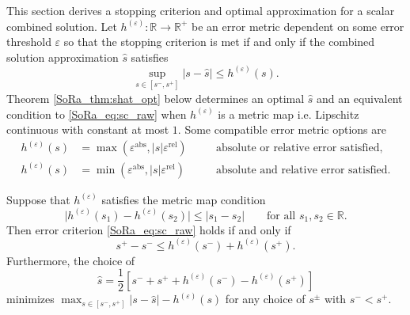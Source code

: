 \documentclass[graybox]{svmult}
\begin{document}
This section derives a stopping criterion and optimal approximation for a scalar combined solution. Let $h^{(\varepsilon)}: \mathbb{R} \to \mathbb{R}^+$ be an error metric dependent on some error threshold $\varepsilon$ so that the stopping criterion is met if and only if the combined solution approximation $\hat{s}$ satisfies 
\begin{equation}
    \sup_{s \in [s^-,s^+]} \lvert s-\hat{s} \rvert \leq h^{(\varepsilon)}(s).
    \label{SoRa_eq:sc_raw}
\end{equation}
Theorem \ref{SoRa_thm:shat_opt} below determines an optimal $\hat{s}$ and an equivalent condition to \eqref{SoRa_eq:sc_raw} when $h^{(\varepsilon)}$ is a metric map i.e. Lipschitz continuous with constant at most $1$. Some compatible error metric options are
\begin{subequations}
\begin{align}
    h^{(\varepsilon)}(s) &= \max\left(\varepsilon^\text{abs},\lvert s \rvert \varepsilon^\text{rel} \right) \quad &&\text{absolute or relative error satisfied,} \label{SoRa_eq:h_abs_or_rel} \\
    h^{(\varepsilon)}(s) &= \min\left(\varepsilon^\text{abs},\lvert s \rvert \varepsilon^\text{rel} \right) \quad &&\text{absolute and relative error satisfied.} \label{SoRa_eq:h_abs_and_rel}
\end{align}
\end{subequations}
\begin{theorem} \label{SoRa_thm:shat_opt}
    Suppose that  $h^{(\varepsilon)}$ satisfies the metric map condition
    \begin{equation}
        \lvert h^{(\varepsilon)}(s_1) - h^{(\varepsilon)}(s_2) \rvert \leq \lvert s_1 - s_2 \rvert \qquad \text{for all } s_1,s_2 \in \mathbb{R}.
        \label{SoRa_eq:metric_map_cond}
    \end{equation}
    Then error criterion  \eqref{SoRa_eq:sc_raw} holds if and only if 
    \begin{equation}
        s^+-s^- \leq h^{(\varepsilon)}(s^-)+h^{(\varepsilon)}(s^+).
        \label{SoRa_eq:sc}
    \end{equation}
    Furthermore, the choice of 
    \begin{equation}
        \hat{s} = \frac{1}{2}\left[s^-+s^++h^{(\varepsilon)}(s^-)-h^{(\varepsilon)}(s^+)\right]
        \label{SoRa_eq:shat_opt}
    \end{equation}
    minimizes $\max_{s \in [s^-,s^+]} \lvert s - \hat{s} \rvert -h^{(\varepsilon)}(s)$ for any choice of $s^{\pm}$ with $s^- < s^+$.
\end{theorem}
\end{document}
